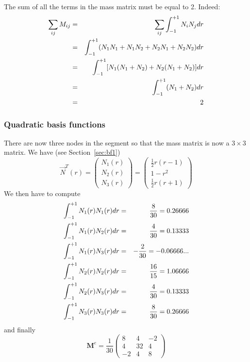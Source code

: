\begin{remark} 
The sum of all the terms in the mass matrix must be equal to 2. Indeed:
\begin{eqnarray}
\sum_{ij} M_{ij} 
&=&\sum_{ij} \int_{-1}^{+1} N_i N_j dr \nonumber\\
&=&\int_{-1}^{+1} (N_1N_1+N_1N_2+N_2N_1+N_2N_2) dr\nonumber\\
&=&\int_{-1}^{+1} [N_1(N_1+N_2)+N_2(N_1+N_2)]dr\nonumber\\
&=&\int_{-1}^{+1} (N_1 + N_2) dr\nonumber\\
&=& 2\nonumber
\end{eqnarray}
\end{remark}


\subsubsection{Quadratic basis functions}
There are now three nodes in the segment so that the mass matrix 
is now a $3\times3$ matrix. We have (see Section~\ref{sec:bf1}) 
\begin{equation}
{\vec N}^T(r) = 
\left(
\begin{array}{c}
N_1(r) \\ 
N_2(r) \\ 
N_3(r) 
\end{array}
\right)
=
\left(
\begin{array}{c}
\frac{1}{2} r (r-1) \\
1-r^2 \\
\frac{1}{2} r (r+1) 
\end{array}
\right)
\end{equation}
We then have to compute
\begin{eqnarray}
\int_{-1}^{+1} N_1(r) N_1(r) dr &=& \frac{8}{30}  = 0.26666 \nonumber\\
\int_{-1}^{+1} N_1(r) N_2(r) dr &=& \frac{4}{30}  =0.13333  \nonumber\\
\int_{-1}^{+1} N_1(r) N_3(r) dr &=& -\frac{2}{30} =-0.06666...\nonumber\\ 
\int_{-1}^{+1} N_2(r) N_2(r) dr &=& \frac{16}{15} = 1.06666 \nonumber\\
\int_{-1}^{+1} N_2(r) N_3(r) dr &=& \frac{4}{30}  =0.13333 \nonumber\\
\int_{-1}^{+1} N_3(r) N_3(r) dr &=& \frac{8}{30} = 0.26666  \nonumber
\end{eqnarray}
and finally 
\begin{equation}
{\bm M}^e 
=
\frac{1}{30}
\left(
\begin{array}{ccc}
8  & 4 & -2 \\
4  & 32 & 4 \\
-2 & 4 & 8
\end{array}
\right)
\end{equation}


